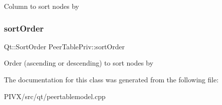 Column to sort nodes by \mbox{\label{class_peer_table_priv_adb95d4bbc4fb13a21a360108aeca5c32}} 
\subsubsection{\texorpdfstring{sort\+Order}{sortOrder}}
{\footnotesize\ttfamily Qt\+::\+Sort\+Order Peer\+Table\+Priv\+::sort\+Order}

Order (ascending or descending) to sort nodes by 

The documentation for this class was generated from the following file\+:\begin{DoxyCompactItemize}
\item 
P\+I\+V\+X/src/qt/peertablemodel.\+cpp\end{DoxyCompactItemize}
